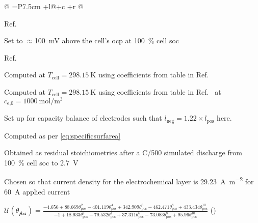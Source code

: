 \begin{table}[!htbp]
\begin{threeparttable}
\begin{tabular*}{\textwidth}{@{} =P{7.5cm}  +l@{\extracolsep{\fill}}+c +r @{}}
            \bottomrule
        \end{tabular*}

        \medskip
        \vspace{-2.6229525pt}
        \begin{tablenotes}
            \begin{scriptsize}
            \item[a] Ref.~\cite{Northrop2011}
            \item[b] Set to $\approx $\SI{100}{\milli\volt} above the cell's \gls{ocp} at \SI{100}{\percent} cell \gls{soc}
            \item[c] Ref.~\cite{Subramanian2009}
            \item[d] Computed at $T_\text{cell} = \SI{298.15}{\kelvin}$ using coefficients from table  in Ref.~\cite{Valoen2005}\\%
            \item[e] Computed at $T_\text{cell} = \SI{298.15}{\kelvin}$ using coefficients from table  in Ref.~\cite{Valoen2005} at $c_\text{e,0}= \SI{1000}{\mole\per\meter\cubed}$\\
            \item[f] Set up for capacity balance of electrodes such that $l_\text{neg} = 1.22 \times l_\text{pos}$ here.
            \item[g] Computed as per \cref{eq:specificsurfarea}\\
            \item[h] Obtained as residual stoichiometries after a C/\num{500} simulated discharge from \SI{100}{\percent} cell \gls{soc} to \SI{2.7}{V}
            \item[i] Chosen so that current density for the electrochemical layer is \SI{29.23}{\ampere\per\meter\squared} for \SI{60}{\ampere} applied current
            \end{scriptsize}
            \vspace{1ex}
        \item[k] $ \mathcal{U(\theta_\text{pos})} = \textstyle \frac{-4.656 + 88.669\theta_\text{pos}^2 - 401.119\theta_\text{pos}^4 + 342.909\theta_\text{pos}^6 - 462.471\theta_\text{pos}^8 + 433.434\theta_\text{pos}^{10}}{-1 + 18.933\theta_\text{pos}^2 - 79.532\theta_\text{pos}^4 + 37.311\theta_\text{pos}^6 - 73.083\theta_\text{pos}^8 + 95.96\theta_\text{pos}^{10}}$ \hspace*{\fill}(\theequation)\label{eq:lcoUocpPos}\\[0.25em]

\end{tablenotes}
\end{threeparttable}
\end{table}
